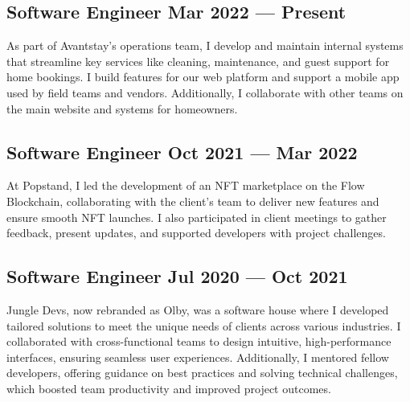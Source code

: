 \documentclass[letter,10pt]{article}
\begin{document}
\subsection{{Software Engineer \hfill Mar 2022 --- Present}}
\vspace{1mm}
\begin{justify}
As part of Avantstay's operations team, I develop and maintain internal systems that streamline key services like cleaning, maintenance, and guest support for home bookings. I build features for our web platform and support a mobile app used by field teams and vendors. Additionally, I collaborate with other teams on the main website and systems for homeowners.
\end{justify}
\vspace{1mm}

\subsection{{Software Engineer \hfill Oct 2021 --- Mar 2022}}
\vspace{1mm}
\begin{justify}
At Popstand, I led the development of an NFT marketplace on the Flow Blockchain, collaborating with the client’s team to deliver new features and ensure smooth NFT launches. I also participated in client meetings to gather feedback, present updates, and supported developers with project challenges.
\end{justify}
\vspace{1mm}

\subsection{{Software Engineer \hfill Jul 2020 --- Oct 2021}}
\vspace{1mm}
\begin{justify}
Jungle Devs, now rebranded as Olby, was a software house where I developed tailored solutions to meet the unique needs of clients across various industries. I collaborated with cross-functional teams to design intuitive, high-performance interfaces, ensuring seamless user experiences. Additionally, I mentored fellow developers, offering guidance on best practices and solving technical challenges, which boosted team productivity and improved project outcomes.
\end{justify}
\vspace{1mm}
\end{document}
